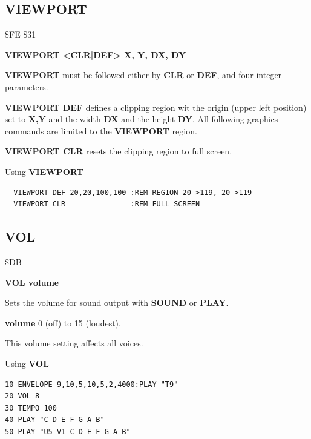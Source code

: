 \subsection{VIEWPORT}
\begin{description}[leftmargin=2cm,style=nextline]
\item [Token:] \$FE \$31
\item [Format:] {\bf VIEWPORT <CLR|DEF> X, Y, DX, DY}
\item [Usage:]
   {\bf VIEWPORT} must be followed either by
   {\bf CLR} or {\bf DEF}, and four integer parameters.

\item [Remarks:]
   {\bf VIEWPORT DEF} defines a clipping region wit the origin
   (upper left position) set to {\bf X,Y} and the width {\bf DX}
   and the height {\bf DY}.
   All following graphics commands are limited to the {\bf VIEWPORT}
   region.

   {\bf VIEWPORT CLR} resets the clipping region to full screen.

\item [Example:] Using {\bf VIEWPORT}
\begin{tcolorbox}[colback=black,coltext=white]
\verbatimfont{\codefont}
\begin{verbatim}
  VIEWPORT DEF 20,20,100,100 :REM REGION 20->119, 20->119
  VIEWPORT CLR               :REM FULL SCREEN
\end{verbatim}
\end{tcolorbox}
\end{description}


\newpage
\subsection{VOL}
\begin{description}[leftmargin=2cm,style=nextline]
\item [Token:] \$DB
\item [Format:] {\bf VOL volume}
\item [Usage:] Sets the volume for sound output with
               {\bf SOUND} or {\bf PLAY}.

               {\bf volume} 0 (off) to 15 (loudest).

\item [Remarks:] This volume setting affects all voices.

\item [Example:] Using {\bf VOL}
\begin{tcolorbox}[colback=black,coltext=white]
\verbatimfont{\codefont}
\begin{verbatim}
10 ENVELOPE 9,10,5,10,5,2,4000:PLAY "T9"
20 VOL 8
30 TEMPO 100
40 PLAY "C D E F G A B"
50 PLAY "U5 V1 C D E F G A B"
\end{verbatim}
\end{tcolorbox}
\end{description}

